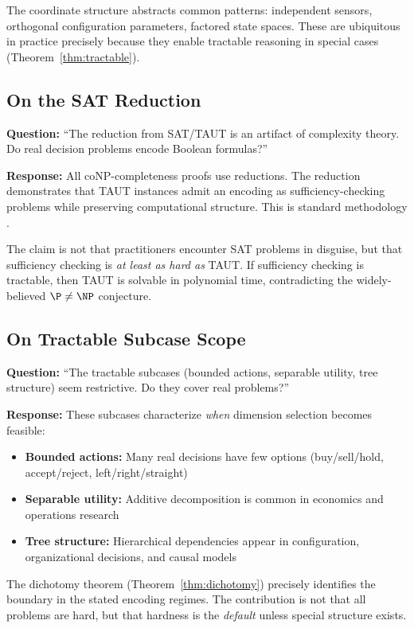 The coordinate structure abstracts common patterns: independent sensors, orthogonal configuration parameters, factored state spaces. These are ubiquitous in practice precisely because they enable tractable reasoning in special cases (Theorem~\ref{thm:tractable}).

\subsection{On the SAT Reduction}

\textbf{Question:} ``The reduction from SAT/TAUT is an artifact of complexity theory. Do real decision problems encode Boolean formulas?''

\textbf{Response:} All coNP-completeness proofs use reductions. The reduction demonstrates that TAUT instances admit an encoding as sufficiency-checking problems while preserving computational structure. This is standard methodology \cite{cook1971complexity, karp1972reducibility}.

The claim is not that practitioners encounter SAT problems in disguise, but that sufficiency checking is \emph{at least as hard as} TAUT. If sufficiency checking is tractable, then TAUT is solvable in polynomial time, contradicting the widely-believed $\P \neq \NP$ conjecture.

\subsection{On Tractable Subcase Scope}

\textbf{Question:} ``The tractable subcases (bounded actions, separable utility, tree structure) seem restrictive. Do they cover real problems?''

\textbf{Response:} These subcases characterize \emph{when} dimension selection becomes feasible:

\begin{itemize}
\item \textbf{Bounded actions:} Many real decisions have few options (buy/sell/hold, accept/reject, left/right/straight)
\item \textbf{Separable utility:} Additive decomposition is common in economics and operations research
\item \textbf{Tree structure:} Hierarchical dependencies appear in configuration, organizational decisions, and causal models
\end{itemize}

The dichotomy theorem (Theorem~\ref{thm:dichotomy}) precisely identifies the boundary in the stated encoding regimes. The contribution is not that all problems are hard, but that hardness is the \emph{default} unless special structure exists.

